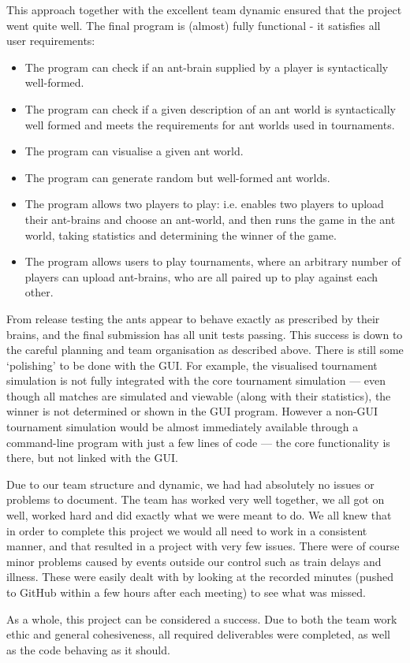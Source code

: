 \documentclass[11pt]{article}
\providecommand{\tightlist}{%
  \setlength{\itemsep}{0pt}\setlength{\parskip}{0pt}}
\begin{document}
This approach together with the excellent team dynamic ensured that the project went quite well. The final program is (almost) fully functional - it satisfies all user requirements:
\begin{itemize}
\tightlist
\item The program can check if an ant-brain supplied by a player is syntactically well-formed.
\item The program can check if a given description of an ant world is syntactically well formed and meets the requirements for ant worlds used in tournaments.
\item The program can visualise a given ant world.
\item The program can generate random but well-formed ant worlds.
\item The program allows two players to play: i.e. enables two players to upload their ant-brains and choose an ant-world, and then runs the game in the ant world, taking statistics and determining the winner of the game. 
\item The program allows users to play tournaments, where an arbitrary number of players can upload ant-brains, who are all paired up to play against each other.
\end{itemize}
From release testing the ants appear to behave exactly as prescribed by their brains, and the final submission has all unit tests passing. This success is down to the careful planning and team organisation as described above. There is still some `polishing' to be done with the GUI. For example, the visualised tournament simulation is not fully integrated with the core tournament simulation --- even though all matches are simulated and viewable (along with their statistics), the winner is not determined or shown in the GUI program. However a non-GUI tournament simulation would be almost immediately available through a command-line program with just a few lines of code --- the core functionality is there, but not linked with the GUI.

Due to our team structure and dynamic, we had had absolutely no issues or problems to document. The team has worked very well together, we all got on well, worked hard and did exactly what we were meant to do. We all knew that in order to complete this project we would all need to work in a consistent manner, and that resulted in a project with very few issues. There were of course minor problems caused by events outside our control such as train delays and illness. These were easily dealt with by looking at the recorded minutes (pushed to GitHub within a few hours after each meeting) to see what was missed.

As a whole, this project can be considered a success. Due to both the team work ethic and general cohesiveness, all required deliverables were completed, as well as the code behaving as it should.
\end{document}
